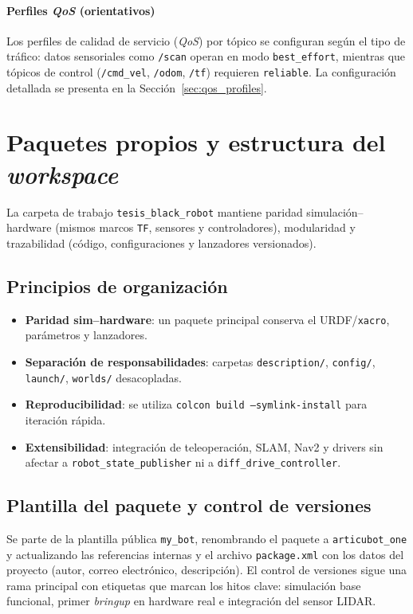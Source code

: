 \paragraph{Perfiles \textit{QoS} (orientativos)}
Los perfiles de calidad de servicio (\textit{QoS}) por tópico se configuran según el tipo de tráfico: datos sensoriales como \texttt{/scan} operan en modo \texttt{best\_effort}, mientras que tópicos de control (\texttt{/cmd\_vel}, \texttt{/odom}, \texttt{/tf}) requieren \texttt{reliable}. La configuración detallada se presenta en la Sección~\ref{sec:qos_profiles}.
\section{Paquetes propios y estructura del \textit{workspace}}

La carpeta de trabajo \texttt{tesis\_black\_robot} mantiene paridad simulación--hardware (mismos marcos \texttt{TF}, sensores y controladores), modularidad y trazabilidad (código, configuraciones y lanzadores versionados).

\subsection{Principios de organización}
\begin{itemize}
  \item \textbf{Paridad sim--hardware}: un paquete principal conserva el URDF/\texttt{xacro}, parámetros y lanzadores.
  \item \textbf{Separación de responsabilidades}: carpetas \texttt{description/}, \texttt{config/}, \texttt{launch/}, \texttt{worlds/} desacopladas.
  \item \textbf{Reproducibilidad}: se utiliza \texttt{colcon build --symlink-install} para iteración rápida.
  \item \textbf{Extensibilidad}: integración de teleoperación, SLAM, Nav2 y drivers sin afectar a \texttt{robot\_state\_publisher} ni a \texttt{diff\_drive\_controller}.
\end{itemize}

\subsection{Plantilla del paquete y control de versiones}
Se parte de la plantilla pública \texttt{my\_bot}, renombrando el paquete a \texttt{articubot\_one} y actualizando las referencias internas y el archivo \texttt{package.xml} con los datos del proyecto (autor, correo electrónico, descripción). El control de versiones sigue una rama principal con etiquetas que marcan los hitos clave: simulación base funcional, primer \textit{bringup} en hardware real e integración del sensor \gls{LIDAR}.

